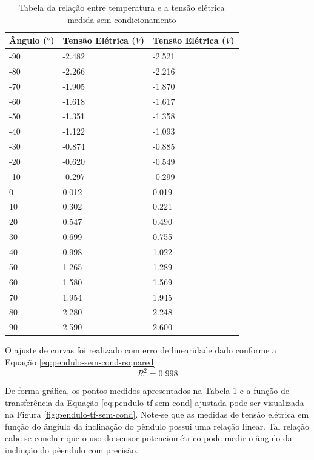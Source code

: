 \documentclass[a4paper]{instrumentacao}
\begin{document}
\begin{table}[]
\centering
\caption{Tabela da relação entre temperatura e a tensão elétrica medida sem condicionamento}
\begin{tabular}{|l|l|l|}
 \hline
 \textbf{Ângulo ($º$)} & \textbf{Tensão Elétrica ($V$)} & \textbf{Tensão Elétrica ($V$)} \\ \hline
 
 -90 & -2.482 & -2.521 	\\ \hline
 -80 & -2.266 & -2.216 	\\ \hline
 -70 & -1.905 & -1.870	\\ \hline
 -60 & -1.618 & -1.617 	\\ \hline
 -50 & -1.351 & -1.358 	\\ \hline
 -40 & -1.122 & -1.093 	\\ \hline
 -30 & -0.874 & -0.885 	\\ \hline
 -20 & -0.620 & -0.549 	\\ \hline
 -10 & -0.297 & -0.299 	\\ \hline
 0 & 0.012 & 0.019 		\\ \hline
 10 & 0.302 & 0.221 	\\ \hline
 20 & 0.547 & 0.490 	\\ \hline
 30 & 0.699 & 0.755 	\\ \hline
 40 & 0.998 & 1.022 	\\ \hline
 50 & 1.265 & 1.289 	\\ \hline
 60 & 1.580 & 1.569 	\\ \hline
 70 & 1.954 & 1.945 	\\ \hline
 80 & 2.280 & 2.248 	\\ \hline
 90 & 2.590 & 2.600 	\\ \hline
 
\end{tabular}
\label{tab:pendulo-calibracao}
\end{table}

O ajuste de curvas foi realizado com erro de linearidade dado conforme a Equação \ref{eq:pendulo-sem-cond-rsquared}
%
\begin{equation}
	R^2 = 0.998
	\label{eq:pendulo-sem-cond-rsquared}
\end{equation}
%

De forma gráfica, os pontos medidos apresentados na Tabela \ref{tab:pendulo-calibracao} e a função de transferência da Equação \ref{eq:pendulo-tf-sem-cond} ajustada pode ser visualizada na Figura \ref{fig:pendulo-tf-sem-cond}. Note-se que as medidas de tensâo elétrica em função do ângiulo da inclinação do pêndulo possui uma relação linear. Tal relação cabe-se concluir que o uso do sensor potenciométrico pode medir o ângulo da inclinção do pêendulo com precisão.
\end{document}
